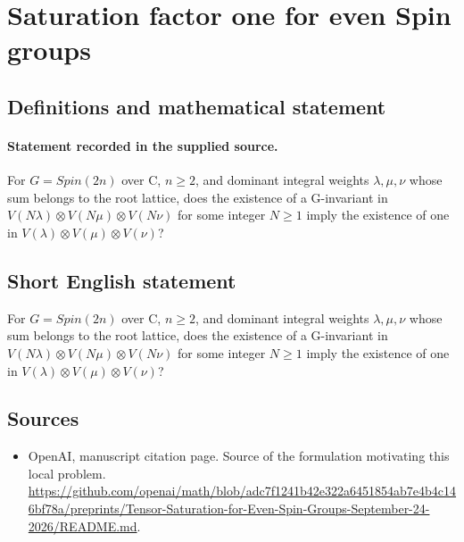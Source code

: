 \documentclass[11pt]{article}
\begin{document}
\section*{Saturation factor one for even Spin groups}\label{statement}
\subsection{Definitions and mathematical statement}
\paragraph{Statement recorded in the supplied source.}
For $G=Spin(2n)$ over C, $n\geq 2$, and dominant integral weights $\lambda ,\mu ,\nu $ whose sum belongs to the root lattice, does the existence of a G-invariant in $V(N\lambda )\otimes V(N\mu )\otimes V(N\nu )$ for some integer $N\geq 1$ imply the existence of one in $V(\lambda )\otimes V(\mu )\otimes V(\nu )$?
\subsection{Short English statement}
For $G=Spin(2n)$ over C, $n\geq 2$, and dominant integral weights $\lambda ,\mu ,\nu $ whose sum belongs to the root lattice, does the existence of a G-invariant in $V(N\lambda )\otimes V(N\mu )\otimes V(N\nu )$ for some integer $N\geq 1$ imply the existence of one in $V(\lambda )\otimes V(\mu )\otimes V(\nu )$?
\subsection{Sources}
\begin{itemize}
\item[S1] OpenAI, manuscript citation page. Source of the formulation motivating this local problem.
\url{https://github.com/openai/math/blob/adc7f1241b42e322a6451854ab7e4b4c146bf78a/preprints/Tensor-Saturation-for-Even-Spin-Groups-September-24-2026/README.md}.
\end{itemize}
\end{document}
